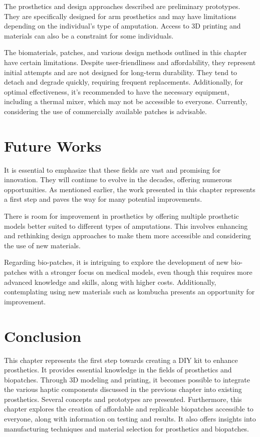 The prosthetics and design approaches described are preliminary prototypes. They are specifically designed for arm prosthetics and may have limitations depending on the individual's type of amputation. Access to 3D printing and materials can also be a constraint for some individuals.

The biomaterials, patches, and various design methods outlined in this chapter have certain limitations. Despite user-friendliness and affordability, they represent initial attempts and are not designed for long-term durability. They tend to detach and degrade quickly, requiring frequent replacements. Additionally, for optimal effectiveness, it's recommended to have the necessary equipment, including a thermal mixer, which may not be accessible to everyone. Currently, considering the use of commercially available patches is advisable.

\section{Future Works}
It is essential to emphasize that these fields are vast and promising for innovation. They will continue to evolve in the decades, offering numerous opportunities. As mentioned earlier, the work presented in this chapter represents a first step and paves the way for many potential improvements.

There is room for improvement in prosthetics by offering multiple prosthetic models better suited to different types of amputations. This involves enhancing and rethinking design approaches to make them more accessible and considering the use of new materials.

Regarding bio-patches, it is intriguing to explore the development of new bio-patches with a stronger focus on medical models, even though this requires more advanced knowledge and skills, along with higher costs. Additionally, contemplating using new materials such as kombucha presents an opportunity for improvement.

\section{Conclusion}
This chapter represents the first step towards creating a DIY kit to enhance prosthetics. It provides essential knowledge in the fields of prosthetics and biopatches. Through 3D modeling and printing, it becomes possible to integrate the various haptic components discussed in the previous chapter into existing prosthetics. Several concepts and prototypes are presented. Furthermore, this chapter explores the creation of affordable and replicable biopatches accessible to everyone, along with information on testing and results. It also offers insights into manufacturing techniques and material selection for prosthetics and biopatches. 